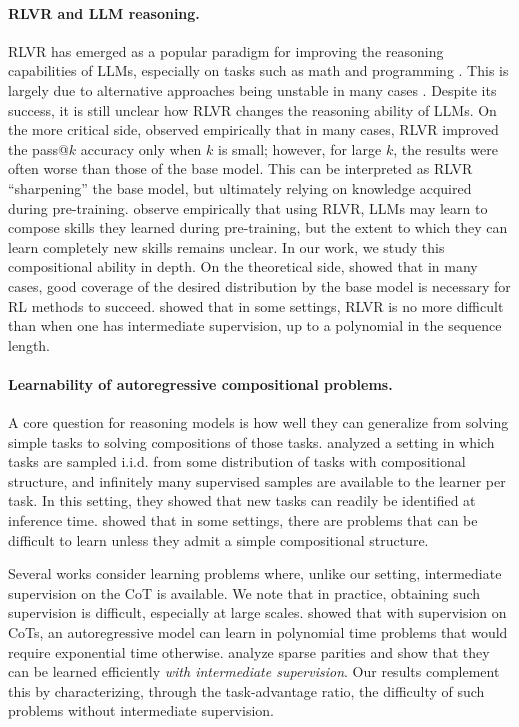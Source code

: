 \documentclass{article}
\theoremstyle{plain}
\theoremstyle{definition}
\theoremstyle{remark}
\begin{document}
\paragraph{RLVR and LLM reasoning. }
RLVR has emerged as a popular paradigm for improving the reasoning capabilities of LLMs, especially on tasks such as math and programming \citep{jaech2024openai, guo2025deepseek, team2025kimi, wang2025reinforcement}. This is largely due to alternative approaches being unstable in many cases \citep{gao2023scaling}. Despite its success, it is still unclear how RLVR changes the reasoning ability of LLMs. On the more critical side, \citet{yue2025does} observed empirically that in many cases, RLVR improved the pass@$k$ accuracy only when $k$ is small; however, for large $k$, the results were often worse than those of the base model. This can be interpreted as RLVR ``sharpening'' the base model, but ultimately relying on knowledge acquired during pre-training. \citet{yuan2025f, wu2025invisible} observe empirically that using RLVR, LLMs may learn to compose skills they learned during pre-training, but the extent to which they can learn completely new skills remains unclear. In our work, we study this compositional ability in depth. On the theoretical side, \citet{foster2025good} showed that in many cases, good coverage of the desired distribution by the base model is necessary for RL methods to succeed. \citet{jia2025we} showed that in some settings, RLVR is no more difficult than when one has intermediate supervision, up to a polynomial in the sequence length.

\paragraph{Learnability of autoregressive compositional problems. }
A core question for reasoning models is how well they can generalize from solving simple tasks to solving compositions of those tasks.
\citet{abedsoltan2025task} analyzed a setting in which tasks are sampled i.i.d. from some distribution of tasks with compositional structure, and infinitely many supervised samples are available to the learner per task. In this setting, they showed that new tasks can readily be identified at inference time. 
\citet{abbe2024far} showed that in some settings, there are problems that can be difficult to learn unless they admit a simple compositional structure. 

Several works consider learning problems where, unlike our setting, intermediate supervision on the CoT is available. We note that in practice, obtaining such supervision is difficult, especially at large scales. \citet{wies2022sub} showed that with supervision on CoTs, an autoregressive model can learn in polynomial time problems that would require exponential time otherwise. \citet{kim2024transformers, wen2024sparse} analyze sparse parities and show that they can be learned efficiently \emph{with intermediate supervision}. Our results complement this by characterizing, through the task-advantage ratio, the difficulty of such problems without intermediate supervision.
\end{document}
